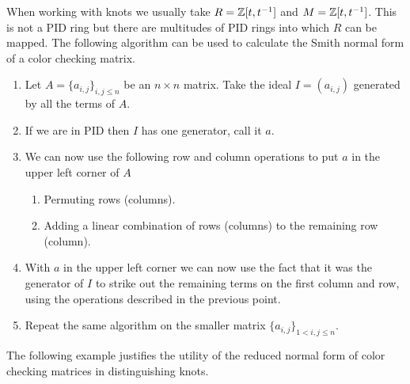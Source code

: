 {\color{purple}
  When working with knots we usually take $R=\operatorname{\mathbb{Z}}[t, t^{-1}]$ and $M=\operatorname{\mathbb{Z}}[t, t^{-1}]$. This is not a PID ring but there are multitudes of PID rings into which $R$ can be mapped. The following algorithm can be used to calculate the Smith normal form of a color checking matrix.

  \begin{enumerate}
    \item Let $A=\{a_{i,j}\}_{i,j\leq n}$ be an $n\times n$ matrix. Take the ideal $I=(a_{i,j})$ generated by all the terms of $A$. 
    \item If we are in PID then $I$ has one generator, call it $a$.
    \item We can now use the following row and column operations to put $a$ in the upper left corner of $A$
      \begin{enumerate}
        \item Permuting rows (columns).
        \item Adding a linear combination of rows (columns) to the remaining row (column).
      \end{enumerate}
    \item With $a$ in the upper left corner we can now use the fact that it was the generator of $I$ to strike out the remaining terms on the first column and row, using the operations described in the previous point.
    \item Repeat the same algorithm on the smaller matrix  $\{a_{i,j}\}_{1<i, j\leq n}$.
  \end{enumerate}
}

The following example justifies the utility of the reduced normal form of color checking matrices in distinguishing knots.

